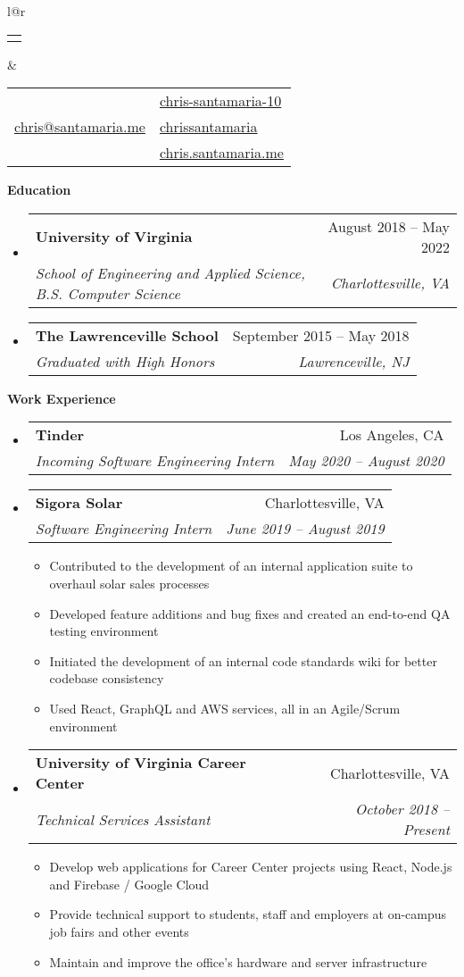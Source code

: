\documentclass[letterpaper,12pt]{article}[leftmargin=*]
\makeatletter
\def \fullname {Chris Santamaria}
\def \linkedinicon {\faLinkedin}
\def \linkedinlink {https://www.linkedin.com/in/chris-santamaria-10}
\def \linkedintext {chris-santamaria-10}
\def \phoneicon {\faPhone}
\def \phonetext {(813) 545-5164}
\def \emailicon {\faEnvelope}
\def \emaillink {mailto:chris@santamaria.me}
\def \emailtext {chris@santamaria.me}
\def \githubicon {\faGithub}
\def \githublink {https://github.com/chrissantamaria}
\def \githubtext {chrissantamaria}
\def \websiteicon {\faGlobe}
\def \websitelink {https://chris.santamaria.me}
\def \websitetext {chris.santamaria.me}
\def \headertype {\doublecol} %
\def \entryspacing {-0pt}
\def \linkedin {\linkedinicon \hspace{3pt}\href{\linkedinlink}{\linkedintext}}
\def \phone {\phoneicon \hspace{3pt}{ \phonetext}}
\def \email {\emailicon \hspace{3pt}\href{\emaillink}{\emailtext}}
\def \github {\githubicon \hspace{3pt}\href{\githublink}{\githubtext}}
\def \website {\websiteicon \hspace{3pt}\href{\websitelink}{\websitetext}}
\renewcommand{\section}[2]{\vspace{5pt}
  \colorbox{secondary}{\color{white}\raggedbottom\normalsize\textbf{{#1}{\hspace{7pt}#2}}}
}
\newcommand{\resumeEntryStart}{\begin{itemize}[leftmargin=2.5mm]}
\newcommand{\resumeEntryEnd}{\end{itemize}\vspace{\entryspacing}}
\newcommand{\resumeItemListStart}{\begin{itemize}[leftmargin=4.5mm]}
\newcommand{\resumeItemListEnd}{\end{itemize}}
\newcommand{\resumeItem}[1]{
  \item\small{
    {#1 \vspace{-2pt}}
  }
}
\newcommand{\resumeEntryTSDL}[4]{
  \vspace{-1pt}\item[]
    \begin{tabular*}{0.97\textwidth}{l@{\extracolsep{\fill}}r}
      \textbf{\color{primary}#1} & {\firabook\color{accent}\small#2} \\
      \textit{\color{accent}\small#3} & \textit{\color{accent}\small#4} \\
    \end{tabular*}\vspace{-7pt}
}
\newcommand{\doublecol}[6]{
  \begin{tabular*}{\textwidth}{l@{\extracolsep{\fill}}r}
    {
      \begin{tabular}[c]{l}
        \fontsize{35}{45}\selectfont{\color{primary}{{\textbf{\fullname}}}}
      \end{tabular}
    } & {
      \begin{tabular}[c]{l@{\hspace{1.5em}}l}
        {\small#4} & {\small#1} \\
        {\small#5} & {\small#2} \\
        {\small#6} & {\small#3}
      \end{tabular}
    }
  \end{tabular*}
}
\newcommand{\singlecol}[6]{
  \begin{tabular*}{\textwidth}{l@{\extracolsep{\fill}}r}
    {
      \begin{tabular}[b]{l}
        \fontsize{35}{45}\selectfont{\color{primary}{{\textbf{\fullname}}}} \\
        {\textit{\subtitle}} %
      \end{tabular}
    } & {
      \begin{tabular}[c]{l}
        {\small#1} \\
        {\small#2} \\
        {\small#3} \\
        {\small#4} \\
        {\small#5} \\
        {\small#6}
      \end{tabular}
    }
  \end{tabular*}
}
\makeatother
\begin{document}


\headertype{\linkedin}{\github}{\website}{\phone}{\email}{} %
\vspace{0pt} %

\section{\faGraduationCap}{Education}

  \resumeEntryStart
    \resumeEntryTSDL
      {University of Virginia}{August 2018 -- May 2022}
      {School of Engineering and Applied Science, B.S. Computer Science}{Charlottesville, VA}
  \resumeEntryEnd
  \resumeEntryStart
  \resumeEntryTSDL
    {The Lawrenceville School}{September 2015 -- May 2018}
    {Graduated with High Honors}{Lawrenceville, NJ}
  \resumeEntryEnd

\section{\faCode}{Work Experience}

  \resumeEntryStart
    \resumeEntryTSDL
      {Tinder}{Los Angeles, CA}
      {Incoming Software Engineering Intern}{May 2020 -- August 2020}
  \resumeEntryEnd

  \resumeEntryStart
    \resumeEntryTSDL
      {Sigora Solar}{Charlottesville, VA}
      {Software Engineering Intern}{June 2019 -- August 2019}
    \resumeItemListStart
      \resumeItem {Contributed to the development of an internal application suite to overhaul solar sales processes}
      \resumeItem {Developed feature additions and bug fixes and created an end-to-end QA testing environment}
      \resumeItem {Initiated the development of an internal code standards wiki for better codebase consistency}
      \resumeItem {Used React, GraphQL and AWS services, all in an Agile/Scrum environment}
    \resumeItemListEnd
  \resumeEntryEnd

  \resumeEntryStart
    \resumeEntryTSDL
      {University of Virginia Career Center}{Charlottesville, VA}
      {Technical Services Assistant}{October 2018 -- Present}
    \resumeItemListStart
      \resumeItem {Develop web applications for Career Center projects using React, Node.js and Firebase / Google Cloud}
      \resumeItem {Provide technical support to students, staff and employers at on-campus job fairs and other events}
      \resumeItem {Maintain and improve the office’s hardware and server infrastructure}
    \resumeItemListEnd
  \resumeEntryEnd
\end{document}
